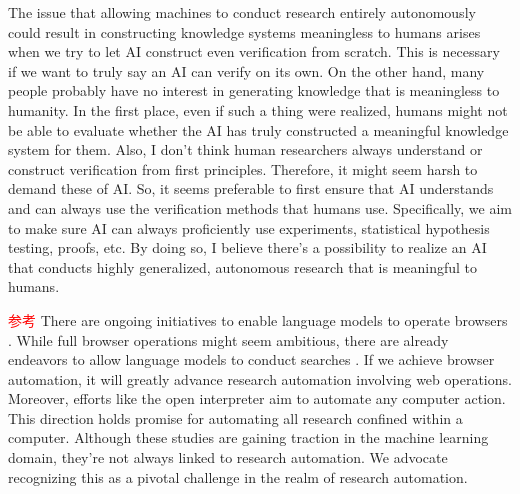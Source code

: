 The issue that allowing machines to conduct research entirely autonomously could result in constructing knowledge systems meaningless to humans arises when we try to let AI construct even verification from scratch. This is necessary if we want to truly say an AI can verify on its own. On the other hand, many people probably have no interest in generating knowledge that is meaningless to humanity. In the first place, even if such a thing were realized, humans might not be able to evaluate whether the AI has truly constructed a meaningful knowledge system for them. Also, I don't think human researchers always understand or construct verification from first principles. Therefore, it might seem harsh to demand these of AI. So, it seems preferable to first ensure that AI understands and can always use the verification methods that humans use. Specifically, we aim to make sure AI can always proficiently use experiments, statistical hypothesis testing, proofs, etc. By doing so, I believe there's a possibility to realize an AI that conducts highly generalized, autonomous research that is meaningful to humans.

\textcolor{red}{参考}
There are ongoing initiatives to enable language models to operate browsers \cite{nakano2021webgpt,act1}. While full browser operations might seem ambitious, there are already endeavors to allow language models to conduct searches \cite{mialon2023augmented}. If we achieve browser automation, it will greatly advance research automation involving web operations. Moreover, efforts like the open interpreter \cite{openinterpreter} aim to automate any computer action. This direction holds promise for automating all research confined within a computer. Although these studies are gaining traction in the machine learning domain, they're not always linked to research automation. We advocate recognizing this as a pivotal challenge in the realm of research automation.

